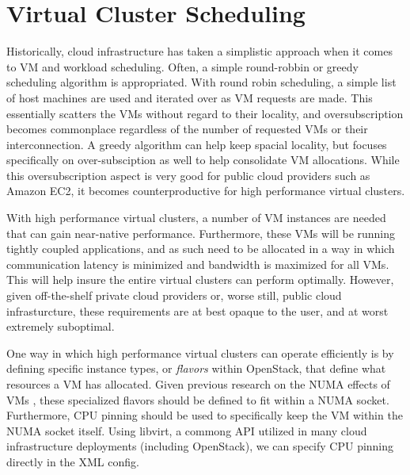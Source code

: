 \section{Virtual Cluster Scheduling}
\label{vcsched}


Historically, cloud infrastructure has taken a simplistic approach when it comes to VM and workload scheduling. Often, a simple round-robbin or greedy \cite{Younge2011eagc} scheduling algorithm is appropriated. With round robin scheduling, a simple list of host machines are used and iterated over as VM requests are made. This essentially scatters the VMs without regard to their locality, and oversubscription becomes commonplace regardless of the number of requested VMs or their interconnection. A greedy algorithm can help keep spacial locality, but focuses specifically on over-subsciption as well to help consolidate VM allocations. While this oversubscription aspect is very good for public cloud providers such as Amazon EC2, it becomes counterproductive for high performance virtual clusters.

With high performance virtual clusters, a number of VM instances are needed that can gain near-native performance. Furthermore, these VMs will be running tightly coupled applications, and as such need to be allocated in a way in which communication latency is minimized and bandwidth is maximized for all VMs. This will help insure the entire virtual clusters can perform optimally.  However, given off-the-shelf private cloud providers or, worse still, public cloud infrasturcture, these requirements are at best opaque to the user, and at worst extremely suboptimal.

One way in which high performance virtual clusters can operate efficiently is by defining specific instance types, or \emph{flavors} within OpenStack, that define what resources a VM has allocated.  Given previous research on the NUMA effects of VMs \cite{openstack-numa}, these specialized flavors should be defined to fit within a NUMA socket.  Furthermore, CPU pinning should be used to specifically keep the VM within the NUMA socket itself.  Using libvirt, a commong API utilized in many cloud infrastructure deployments (including OpenStack), we can specify CPU pinning directly in the XML config.

